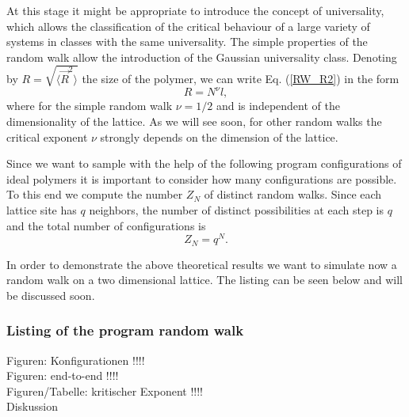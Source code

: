 At this stage it might be appropriate to introduce the concept of 
universality, which allows the classification of the critical 
behaviour of a large variety of systems in classes with the same 
universality. The simple properties of the random walk allow the 
introduction of the Gaussian universality class. Denoting by
$R = \sqrt{\langle \vec{R}^2\rangle}$ the size of the polymer, we 
can write  Eq. (\ref{RW_R2}) in the form
\begin{equation*}
R = N^{\nu}l,
\end{equation*}
where for the simple random walk $\nu = 1/2$ and is independent of 
the dimensionality of the lattice. As we will see soon, for other 
random walks the critical exponent $\nu$ strongly depends on the 
dimension of the lattice.

Since we want to sample with the help of the following program
configurations of ideal polymers it is important to consider how 
many configurations are possible. To this end we compute the 
number $Z_N$ of distinct random walks. Since each lattice site 
has $q$ neighbors,
the number of distinct possibilities at each step is $q$ and the 
total number of configurations is
\begin{equation}
\label{Z_NRW}
Z_N = q^N.
\end{equation}

In order to demonstrate the above theoretical results we want to 
simulate now a random walk on a two dimensional lattice.
The listing can be seen below and will be discussed soon.

\subsubsection{Listing of the program random walk}

Figuren: Konfigurationen !!!! \\

Figuren: end-to-end !!!!\\

Figuren/Tabelle: kritischer Exponent !!!! \\

Diskussion \\

